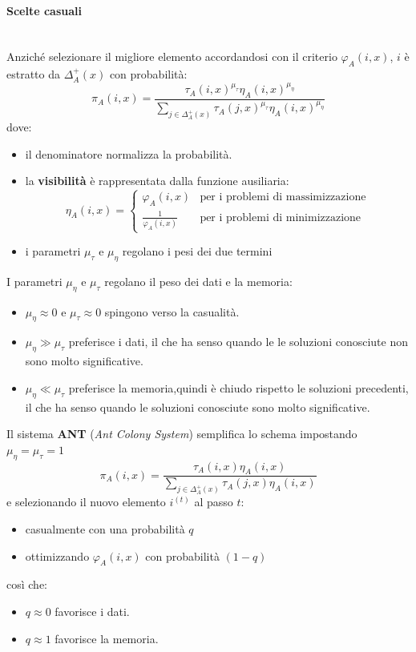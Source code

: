 \documentclass{article}
\begin{document}
\paragraph{Scelte casuali}\mbox{}\\
Anziché selezionare il migliore elemento accordandosi con il criterio $\varphi_A(i,x)$, $i$ è
estratto da $\Delta_A^+(x)$ con probabilità:
$$\pi_A(i,x)=\frac{\tau_A(i,x)^{\mu_\tau}\eta_A(i,x)^{\mu_\eta}}{\sum_{j\in\Delta_A^+(x)}\tau_A(j,x)^{\mu_\tau}\eta_A(i,x)^{\mu_\eta}}$$
dove:
\begin{itemize}
    \item il denominatore normalizza la probabilità.
    \item la \textbf{visibilità} è rappresentata dalla funzione ausiliaria:
          \[\eta_A(i,x)=
              \begin{cases}
                  \varphi_A(i,x)           & \text{per i problemi di massimizzazione} \\
                  \frac{1}{\varphi_A(i,x)} & \text{per i problemi di minimizzazione}
              \end{cases}
          \]
    \item i parametri $\mu_\tau$ e $\mu_\eta$ regolano i pesi dei due termini
\end{itemize}
I parametri $\mu_\eta$ e $\mu_\tau$ regolano il peso dei dati e la memoria:
\begin{itemize}
    \item $\mu_\eta\approx 0$ e $\mu_\tau\approx 0$ spingono verso la casualità.
    \item $\mu_\eta \gg\mu_\tau$ preferisce i dati, il che ha senso quando le
          le soluzioni conosciute non sono molto significative.
    \item $\mu_\eta\ll\mu_\tau$ preferisce la memoria,quindi è chiudo rispetto le soluzioni
          precedenti, il che ha senso quando le soluzioni conosciute sono molto significative.
\end{itemize}
Il sistema \textbf{ANT} (\textit{Ant Colony System}) semplifica lo schema impostando $\mu_\eta=\mu_\tau=1$
$$\pi_A(i,x)=\frac{\tau_A(i,x)\eta_A(i,x)}{\sum_{j\in\Delta_A^+(x)}\tau_A(j,x)\eta_A(i,x)}$$
e selezionando il nuovo elemento $i^{(t)}$ al passo $t$:
\begin{itemize}
    \item casualmente con una probabilità $q$
    \item ottimizzando $\varphi_A(i,x)$ con probabilità $(1-q)$
\end{itemize}
così che:
\begin{itemize}
    \item $q\approx 0$ favorisce i dati.
    \item $q\approx 1$ favorisce la memoria.
\end{itemize}
\end{document}
